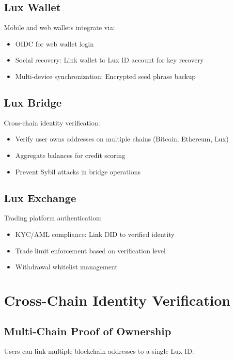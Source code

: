 \documentclass[11pt,a4paper]{article}
\begin{document}
\subsection{Lux Wallet}

Mobile and web wallets integrate via:
\begin{itemize}
  \item OIDC for web wallet login
  \item Social recovery: Link wallet to Lux ID account for key recovery
  \item Multi-device synchronization: Encrypted seed phrase backup
\end{itemize}

\subsection{Lux Bridge}

Cross-chain identity verification:
\begin{itemize}
  \item Verify user owns addresses on multiple chains (Bitcoin, Ethereum, Lux)
  \item Aggregate balances for credit scoring
  \item Prevent Sybil attacks in bridge operations
\end{itemize}

\subsection{Lux Exchange}

Trading platform authentication:
\begin{itemize}
  \item KYC/AML compliance: Link DID to verified identity
  \item Trade limit enforcement based on verification level
  \item Withdrawal whitelist management
\end{itemize}

\section{Cross-Chain Identity Verification}

\subsection{Multi-Chain Proof of Ownership}

Users can link multiple blockchain addresses to a single Lux ID:
\end{document}
